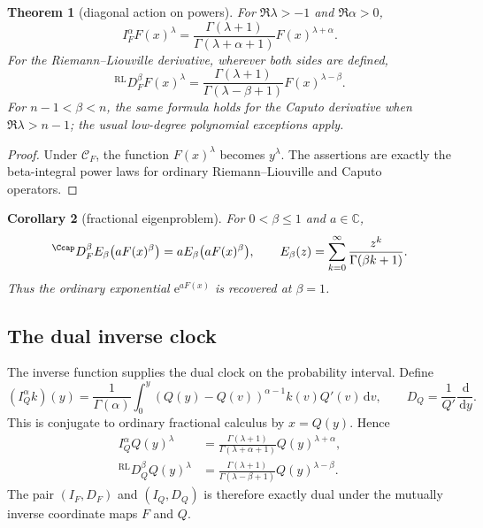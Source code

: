 \documentclass[11pt,oneside]{article}
\newtheorem{theorem}{Theorem}[section]
\newtheorem{corollary}[theorem]{Corollary}
\theoremstyle{definition}
\theoremstyle{remark}
\newcommand{\C}{\mathbb C}
\newcommand{\dd}{\,\mathrm d}
\newcommand{\e}{\mathrm e}
\newcommand{\1}{\mathbf 1}
\begin{document}
\begin{theorem}[diagonal action on powers]
For $\Re\lambda>-1$ and $\Re\alpha>0$,
\begin{equation}
 I_F^\alpha F(x)^\lambda
 =\frac{\Gamma(\lambda+1)}{\Gamma(\lambda+\alpha+1)}
  F(x)^{\lambda+\alpha}.
 \label{p9:eq:F-clock-power-integral}
\end{equation}
For the Riemann--Liouville derivative, wherever both sides are defined,
\begin{equation}
 {}^{\mathrm{RL}}D_F^\beta F(x)^\lambda
 =\frac{\Gamma(\lambda+1)}{\Gamma(\lambda-\beta+1)}
  F(x)^{\lambda-\beta}.
 \label{p9:eq:F-clock-power-RL}
\end{equation}
For $n-1<\beta<n$, the same formula holds for the Caputo derivative when
$\Re\lambda>n-1$; the usual low-degree polynomial exceptions apply.
\end{theorem}

\begin{proof}
Under $\mathcal C_F$, the function $F(x)^\lambda$ becomes $y^\lambda$.
The assertions are exactly the beta-integral power laws for ordinary
Riemann--Liouville and Caputo operators.
\end{proof}

\begin{corollary}[fractional eigenproblem]
For $0<\beta\le1$ and $a\in\C$,
\begin{equation}
 {}^{\Ccap}D_F^\beta
 E_\beta\bigl(aF(x)^\beta\bigr)
 =aE_\beta\bigl(aF(x)^\beta\bigr),
 \qquad
 E_\beta(z)=\sum_{k=0}^{\infty}\frac{z^k}{\Gamma(\beta k+1)}.
 \label{p9:eq:F-clock-Mittag}
\end{equation}
Thus the ordinary exponential $\e^{aF(x)}$ is recovered at $\beta=1$.
\end{corollary}

\subsection{The dual inverse clock}

The inverse function supplies the dual clock on the probability interval.
Define
\begin{equation}
 (I_Q^\alpha k)(y)
 =\frac1{\Gamma(\alpha)}
  \int_0^y(Q(y)-Q(v))^{\alpha-1}k(v)Q'(v)\dd v,
 \qquad
 D_Q=\frac1{Q'}\frac{\dd}{\dd y}.
 \label{p9:eq:IQ-DQ}
\end{equation}
This is conjugate to ordinary fractional calculus by $x=Q(y)$.  Hence
\begin{align}
 I_Q^\alpha Q(y)^\lambda
 &=\frac{\Gamma(\lambda+1)}{\Gamma(\lambda+\alpha+1)}
 Q(y)^{\lambda+\alpha},
 \label{p9:eq:Q-clock-power-I}\\
 {}^{\mathrm{RL}}D_Q^\beta Q(y)^\lambda
 &=\frac{\Gamma(\lambda+1)}{\Gamma(\lambda-\beta+1)}
 Q(y)^{\lambda-\beta}.
 \label{p9:eq:Q-clock-power-D}
\end{align}
The pair $(I_F,D_F)$ and $(I_Q,D_Q)$ is therefore exactly dual under the
mutually inverse coordinate maps $F$ and $Q$.
\end{document}
